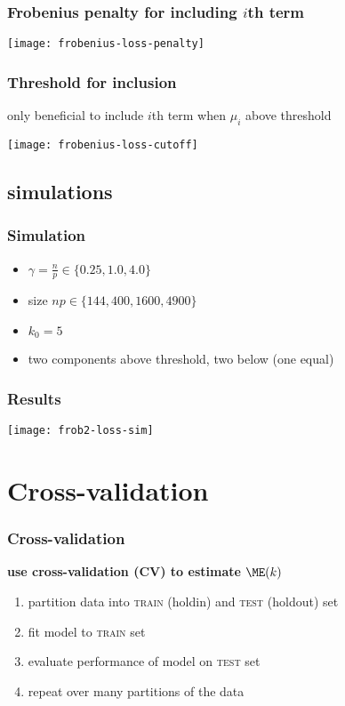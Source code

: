 \documentclass{beamer}
\begin{document}
\begin{frame}
  \frametitle{Frobenius penalty for including $i$th term}
  \begin{center}
  \texttt{[image: frobenius-loss-penalty]}
  \end{center}
\end{frame}

\begin{frame}
  \frametitle{Threshold for inclusion}
  only beneficial to include $i$th term when $\mu_i$ above threshold
  \begin{center}
  \texttt{[image: frobenius-loss-cutoff]}
  \end{center}
\end{frame}
\subsection{simulations}

\begin{frame}
  \frametitle{Simulation}
  \begin{itemize}
  \item $\gamma = \frac{n}{p} \in \{ 0.25, 1.0, 4.0 \}$
  \item size $n p \in \{ 144, 400, 1600, 4900 \}$
  \item $k_0 = 5$
  \item two components above threshold, two below (one equal)
  \end{itemize}
\end{frame}

\begin{frame}
  \frametitle{Results}
  \begin{center}
  \texttt{[image: frob2-loss-sim]}
  \end{center}
\end{frame}


\section{Cross-validation}

\begin{frame}
  \frametitle{Cross-validation}
  \textbf{use cross-validation (CV) to estimate $\ME(k)$}
  \begin{enumerate}
  \item partition data into \textsc{train} (holdin) and \textsc{test} (holdout) set
  \item fit model to \textsc{train} set   
  \item evaluate performance of model on \textsc{test} set
  \item repeat over many partitions of the data
  \end{enumerate}
\end{frame}
\end{document}
